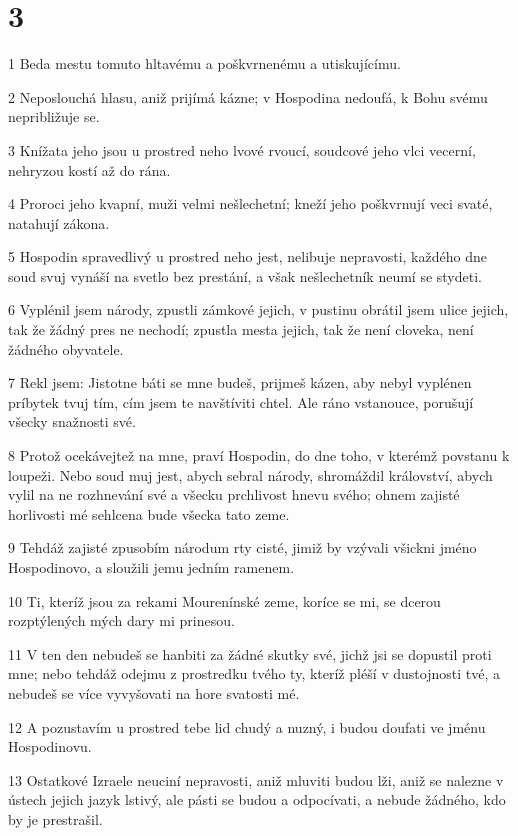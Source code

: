 \chapter{3}

\par 1 Beda mestu tomuto hltavému a poškvrnenému a utiskujícímu.
\par 2 Neposlouchá hlasu, aniž prijímá kázne; v Hospodina nedoufá, k Bohu svému nepribližuje se.
\par 3 Knížata jeho jsou u prostred neho lvové rvoucí, soudcové jeho vlci vecerní, nehryzou kostí až do rána.
\par 4 Proroci jeho kvapní, muži velmi nešlechetní; kneží jeho poškvrnují veci svaté, natahují zákona.
\par 5 Hospodin spravedlivý u prostred neho jest, nelibuje nepravosti, každého dne soud svuj vynáší na svetlo bez prestání, a však nešlechetník neumí se stydeti.
\par 6 Vyplénil jsem národy, zpustli zámkové jejich, v pustinu obrátil jsem ulice jejich, tak že žádný pres ne nechodí; zpustla mesta jejich, tak že není cloveka, není žádného obyvatele.
\par 7 Rekl jsem: Jistotne báti se mne budeš, prijmeš kázen, aby nebyl vyplénen príbytek tvuj tím, cím jsem te navštíviti chtel. Ale ráno vstanouce, porušují všecky snažnosti své.
\par 8 Protož ocekávejtež na mne, praví Hospodin, do dne toho, v kterémž povstanu k loupeži. Nebo soud muj jest, abych sebral národy, shromáždil království, abych vylil na ne rozhnevání své a všecku prchlivost hnevu svého; ohnem zajisté horlivosti mé sehlcena bude všecka tato zeme.
\par 9 Tehdáž zajisté zpusobím národum rty cisté, jimiž by vzývali všickni jméno Hospodinovo, a sloužili jemu jedním ramenem.
\par 10 Ti, kteríž jsou za rekami Mourenínské zeme, koríce se mi, se dcerou rozptýlených mých dary mi prinesou.
\par 11 V ten den nebudeš se hanbiti za žádné skutky své, jichž jsi se dopustil proti mne; nebo tehdáž odejmu z prostredku tvého ty, kteríž pléší v dustojnosti tvé, a nebudeš se více vyvyšovati na hore svatosti mé.
\par 12 A pozustavím u prostred tebe lid chudý a nuzný, i budou doufati ve jménu Hospodinovu.
\par 13 Ostatkové Izraele neuciní nepravosti, aniž mluviti budou lži, aniž se nalezne v ústech jejich jazyk lstivý, ale pásti se budou a odpocívati, a nebude žádného, kdo by je prestrašil.
